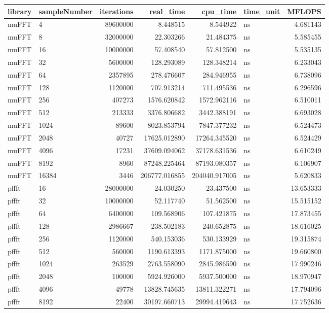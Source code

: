 \begin{tabular}{llrrrlr}
\toprule
library & sampleNumber & iterations & real\_time & cpu\_time & time\_unit & MFLOPS \\
\midrule
muFFT & 4 & 89600000 & 8.448515 & 8.544922 & ns & 4.681143 \\
muFFT & 8 & 32000000 & 22.303266 & 21.484375 & ns & 5.585455 \\
muFFT & 16 & 10000000 & 57.408540 & 57.812500 & ns & 5.535135 \\
muFFT & 32 & 5600000 & 128.293089 & 128.348214 & ns & 6.233043 \\
muFFT & 64 & 2357895 & 278.476607 & 284.946955 & ns & 6.738096 \\
muFFT & 128 & 1120000 & 707.913214 & 711.495536 & ns & 6.296596 \\
muFFT & 256 & 407273 & 1576.620842 & 1572.962116 & ns & 6.510011 \\
muFFT & 512 & 213333 & 3376.806682 & 3442.388191 & ns & 6.693028 \\
muFFT & 1024 & 89600 & 8023.853794 & 7847.377232 & ns & 6.524473 \\
muFFT & 2048 & 40727 & 17625.012890 & 17264.345520 & ns & 6.524429 \\
muFFT & 4096 & 17231 & 37609.094062 & 37178.631536 & ns & 6.610249 \\
muFFT & 8192 & 8960 & 87248.225464 & 87193.080357 & ns & 6.106907 \\
muFFT & 16384 & 3446 & 206777.016855 & 204040.917005 & ns & 5.620833 \\
pffft & 16 & 28000000 & 24.030250 & 23.437500 & ns & 13.653333 \\
pffft & 32 & 10000000 & 52.117740 & 51.562500 & ns & 15.515152 \\
pffft & 64 & 6400000 & 109.568906 & 107.421875 & ns & 17.873455 \\
pffft & 128 & 2986667 & 238.502183 & 240.652875 & ns & 18.616025 \\
pffft & 256 & 1120000 & 540.153036 & 530.133929 & ns & 19.315874 \\
pffft & 512 & 560000 & 1190.613393 & 1171.875000 & ns & 19.660800 \\
pffft & 1024 & 263529 & 2763.558090 & 2845.986590 & ns & 17.990246 \\
pffft & 2048 & 100000 & 5924.926000 & 5937.500000 & ns & 18.970947 \\
pffft & 4096 & 49778 & 13828.745635 & 13811.322271 & ns & 17.794096 \\
pffft & 8192 & 22400 & 30197.660713 & 29994.419643 & ns & 17.752636 \\

\end{tabular}
